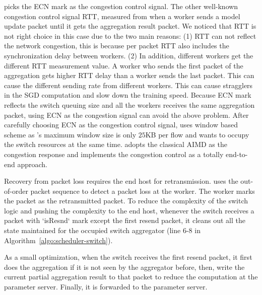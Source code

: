 \system picks the ECN mark as the congestion control signal. 
The other well-known congestion control 
signal RTT,  measured from when a worker sends a model update packet until it gets the aggregation result packet.
We noticed that RTT is not right choice in this case due to the two main reasons:
(1) RTT can not reflect the network congestion, this is because per packet RTT
also includes the synchronization delay between workers.
(2) In addition, different workers get the different RTT measurement value.
A worker who sends the first packet of the aggregation gets higher RTT delay than a worker sends the last packet. This can cause the different sending rate from different workers. 
This can cause stragglers in the SGD computation and slow down the training speed.
Because ECN mark reflects the switch queuing size and all the workers receives the same aggregation packet, using ECN as the congestion signal can avoid the above problem.
After carefully choosing ECN as the congestion control signal,
\system uses window based scheme as \system's maximum window size
is only $25$KB per flow and wants to occupy the switch resources
at the same time.
\system adopts the classical AIMD as the congestion response and implements 
the congestion control as a totally end-to-end approach.

Recovery from packet loss requires the end host for retransmission.
\system uses the out-of-order packet sequence to detect a packet loss at the worker.
The worker marks the packet as the retransmitted packet. 
To reduce the complexity of the switch logic and pushing the complexity to the end host,
whenever the switch receives a packet with `isResnd` mark except the first resend packet, it cleans
out all the state maintained for the occupied switch aggregator (line 6-8 in Algorithm~\ref{algo:scheduler-switch}).

As a small optimization, when the switch receives the first resend packet, 
it first does the aggregation if it is not seen by the aggregator before, then, write the 
current partial aggregation result to that packet to reduce the computation at the parameter server.
Finally, it is forwarded to the parameter server.


